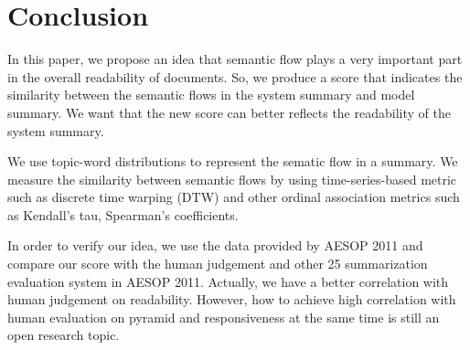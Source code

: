 \section{Conclusion}
\label{sec:conclude}


In this paper, we propose an idea that semantic flow plays a very 
important part in the overall readability of documents. So, we produce 
a score that indicates the similarity between the semantic flows 
in the system summary and model summary. We want that the new score can
better reflects the readability of the system summary. 

We use topic-word distributions to represent the sematic flow in a summary. 
We measure the similarity between semantic flows by using time-series-based 
metric such as discrete time warping (DTW) and other ordinal association 
metrics such as Kendall's tau, Spearman's coefficients. 

In order to verify our idea, we use the data provided by AESOP 2011 
and compare our score with the human judgement and other 25 
summarization evaluation system in AESOP 2011. Actually, we have a better
correlation with human judgement on readability. However, how to achieve 
high correlation with human evaluation on pyramid and responsiveness 
at the same time is still an open research topic.


